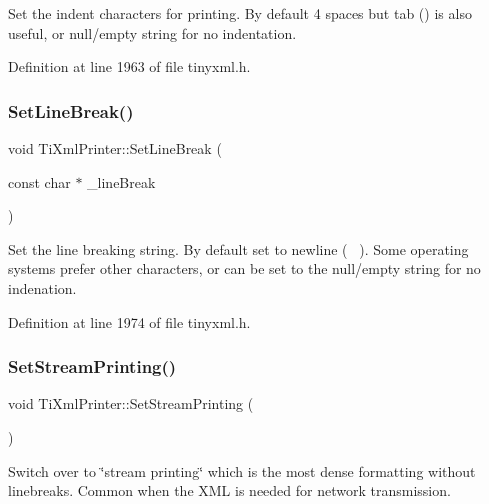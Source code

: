 Set the indent characters for printing. By default 4 spaces but tab () is also useful, or null/empty string for no indentation. 

Definition at line 1963 of file tinyxml.\+h.

\hypertarget{class_ti_xml_printer_a4be1e37e69e3858c59635aa947174fe6}{}\label{class_ti_xml_printer_a4be1e37e69e3858c59635aa947174fe6} 
\subsubsection{\texorpdfstring{Set\+Line\+Break()}{SetLineBreak()}}
{\footnotesize\ttfamily void Ti\+Xml\+Printer\+::\+Set\+Line\+Break (\begin{DoxyParamCaption}\item[{const char $\ast$}]{\+\_\+line\+Break }\end{DoxyParamCaption})\hspace{0.3cm}{\ttfamily [inline]}}

Set the line breaking string. By default set to newline (~\newline
). Some operating systems prefer other characters, or can be set to the null/empty string for no indenation. 

Definition at line 1974 of file tinyxml.\+h.

\hypertarget{class_ti_xml_printer_ab23a90629e374cb1cadca090468bbd19}{}\label{class_ti_xml_printer_ab23a90629e374cb1cadca090468bbd19} 
\subsubsection{\texorpdfstring{Set\+Stream\+Printing()}{SetStreamPrinting()}}
{\footnotesize\ttfamily void Ti\+Xml\+Printer\+::\+Set\+Stream\+Printing (\begin{DoxyParamCaption}{ }\end{DoxyParamCaption})\hspace{0.3cm}{\ttfamily [inline]}}

Switch over to \char`\"{}stream printing\char`\"{} which is the most dense formatting without linebreaks. Common when the X\+ML is needed for network transmission. 


